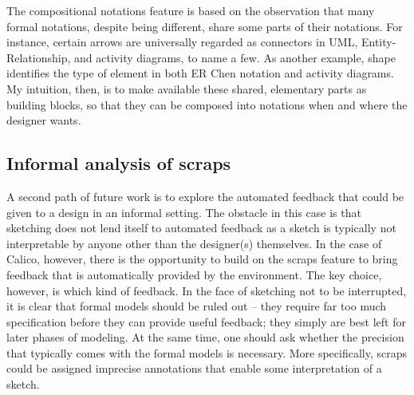 The compositional notations feature is based on the observation that many formal notations, despite being different, share some parts of their notations. For instance, certain arrows are universally regarded as connectors in UML, Entity-Relationship, and activity diagrams, to name a few. As another example, shape identifies the type of element in both ER Chen notation and activity diagrams. My intuition, then, is to make available these shared, elementary parts as building blocks, so that they can be composed into
notations when and where the designer wants. 

%
%

\subsection{Informal analysis of scraps}
%
%
%
%
A second path of future work is to explore the automated feedback that could be given to a design in an informal setting. The obstacle in this case is that sketching does not lend itself to automated feedback as a sketch is typically not interpretable by anyone other than the designer(s) themselves. In the case of Calico, however, there is the opportunity to build on the scraps feature to bring feedback that is automatically provided by the environment. The key choice, however, is which kind of feedback. In the face of sketching not to be interrupted, it is clear that formal models should be ruled out -- they require far too much specification before they can provide useful feedback; they simply are best left for later phases of modeling. At the same time, one should ask whether the precision that typically comes with the formal models is necessary. More specifically, scraps could be assigned imprecise annotations that enable some interpretation of a sketch.

